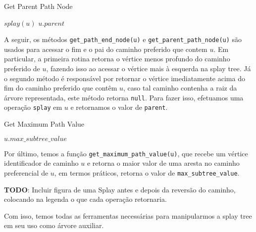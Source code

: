 \begin{algorithm}[h!]
    \caption{Get Parent Path Node}\label{splay:get-parent-path}
    \begin{algorithmic}
        \State $splay(u)$
        \State \Return $u.parent$
        \EndFunction
    \end{algorithmic}
\end{algorithm}

A seguir, os métodos \texttt{get\_path\_end\_node(u)} e \texttt{get\_parent\_path\_node(u)} são usados para acessar o fim e o pai do caminho preferido que contem $u$. Em particular, a primeira rotina retorna o vértice menos profundo do caminho preferido de $u$, fazendo isso ao acessar o vértice mais à esquerda na splay tree. Já o segundo método é responsável por retornar o vértice imediatamente acima do fim do caminho preferido que contêm $u$, caso tal caminho contenha a raiz da árvore representada, este método retorna \texttt{null}. Para fazer isso, efetuamos uma operação \texttt{splay} em $u$ e retornamos o valor de \texttt{parent}.

\begin{algorithm}[h!]
    \caption{Get Maximum Path Value}\label{splay:get-maximum-value}
    \begin{algorithmic}
        \State \Return $u.max\_subtree\_value$
        \EndFunction
    \end{algorithmic}
\end{algorithm}

Por último, temos a função \texttt{get\_maximum\_path\_value(u)}, que recebe um vértice identificador de caminho $u$ e retorna o maior valor de uma aresta no caminho preferencial de $u$, em termos práticos, retorna o valor de \texttt{max\_subtree\_value}.

\begin{center}
    \textbf{TODO}: Incluir figura de uma Splay antes e depois da reversão do caminho, colocando na legenda o que cada operação retornaria.
\end{center}

Com isso, temos todas as ferramentas necessárias para manipularmos a splay tree em seu uso como árvore auxiliar.